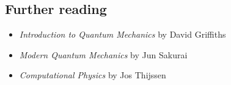 \documentclass[prb,aps,11pt,superscriptaddress,floatfix]{revtex4-2}
\begin{document}
\subsection{Further reading}

\begin{itemize}
  \item \emph{Introduction to Quantum Mechanics} by David Griffiths
  \item \emph{Modern Quantum Mechanics} by Jun Sakurai
  \item \emph{Computational Physics} by Jos Thijssen
\end{itemize}




\end{document}
